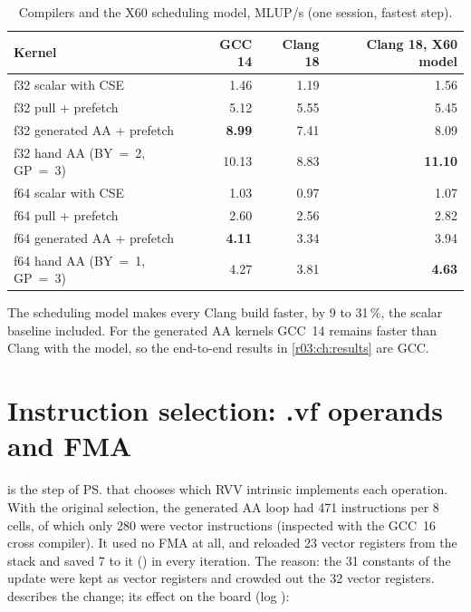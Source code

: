 \begin{table}[htbp]
  \centering\small
  \caption{Compilers and the X60 scheduling model, MLUP/s (one session, fastest step).}\label{r03:tab:tune}
  \begin{tabular}{@{}lrrr@{}}
    \toprule
    \textbf{Kernel} & \textbf{GCC 14} & \textbf{Clang 18} & \textbf{Clang 18, X60 model}\\
    \midrule
    f32 scalar with CSE & 1.46 & 1.19 & 1.56\\
    f32 pull + prefetch & 5.12 & 5.55 & 5.45\\
    f32 generated AA + prefetch & \textbf{8.99} & 7.41 & 8.09\\
    f32 hand AA (BY~=~2, GP~=~3) & 10.13 & 8.83 & \textbf{11.10}\\
    f64 scalar with CSE & 1.03 & 0.97 & 1.07\\
    f64 pull + prefetch & 2.60 & 2.56 & 2.82\\
    f64 generated AA + prefetch & \textbf{4.11} & 3.34 & 3.94\\
    f64 hand AA (BY~=~1, GP~=~3) & 4.27 & 3.81 & \textbf{4.63}\\
    \bottomrule
  \end{tabular}
\end{table}

The scheduling model makes every Clang build faster, by 9 to 31\,\%, the scalar baseline
included. For the generated AA kernels GCC~14 remains faster than Clang with the model, so the
end-to-end results in \cref{r03:ch:results} are GCC.

\section{Instruction selection: .vf operands and FMA}\label{r03:sec:lever-selector}

 is the step of \ps{} that chooses which RVV intrinsic implements
each operation. With the original selection, the generated AA loop had 471 instructions per 8
cells, of which only 280 were vector instructions (inspected with the GCC~16 cross compiler).
It used no FMA at all, and reloaded 23 vector registers from the stack and saved 7 to it
() in every iteration. The reason: the 31 constants of the update were kept as
vector registers and crowded out the 32 vector registers. 
describes the change; its effect on the board (log ):

